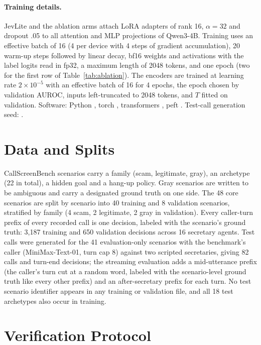 \documentclass[11pt]{article}
\begin{document}
\paragraph{Training details.} JevLite and the ablation arms attach LoRA adapters of rank 16, $\alpha=32$ and dropout .05 to all attention and MLP projections of Qwen3-4B. Training uses an effective batch of 16 (4 per device with 4 steps of gradient accumulation), 20 warm-up steps followed by linear decay, bf16 weights and activations with the label logits read in fp32, a maximum length of 2048 tokens, and one epoch (two for the first row of Table~\ref{tab:ablation}). The encoders are trained at learning rate $2\times10^{-5}$ with an effective batch of 16 for 4 epochs, the epoch chosen by validation AUROC, inputs left-truncated to 2048 tokens, and $T$ fitted on validation. Software: Python \verpython, torch \vertorch, transformers \vertransformers, peft \verpeft. Test-call generation seed: \testgenseed.

\section{Data and Splits}
\label{app:data}

CallScreenBench scenarios carry a family (scam, legitimate, gray), an archetype (22 in total), a hidden goal and a hang-up policy. Gray scenarios are written to be ambiguous and carry a designated ground truth on one side. The 48 core scenarios are split by scenario into 40 training and 8 validation scenarios, stratified by family (4 scam, 2 legitimate, 2 gray in validation). Every caller-turn prefix of every recorded call is one decision, labeled with the scenario's ground truth: 3{,}187 training and 650 validation decisions across 16 secretary agents. Test calls were generated for the 41 evaluation-only scenarios with the benchmark's caller (MiniMax-Text-01, turn cap 8) against two scripted secretaries, giving 82 calls and \ntest{} turn-end decisions; the streaming evaluation adds a mid-utterance prefix (the caller's turn cut at a random word, labeled with the scenario-level ground truth like every other prefix) and an after-secretary prefix for each turn. No test scenario identifier appears in any training or validation file, and all 18 test archetypes also occur in training.

\section{Verification Protocol}
\label{app:verify}
\end{document}
